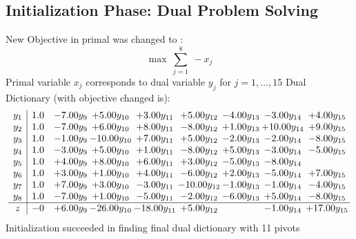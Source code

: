 \documentclass[9pt]{article}
\begin{document}
\subsection{Initialization Phase: Dual Problem Solving}
New Objective in primal was changed to : \[ \max\ \sum_{j=1}^{8}\ - x_j \] 
Primal variable $x_j$ corresponds to dual variable $y_j$ for $j = 1,\ldots,15$
Dual Dictionary (with objective changed is): 
\[\begin{array}{c| c c@{\hskip 2pt} c@{\hskip 2pt} c@{\hskip 2pt} c@{\hskip 2pt} c@{\hskip 2pt} c@{\hskip 2pt} c@{\hskip 2pt} }
 y_{1}   &  1.0 & -7.00 y_{9} & +  5.00 y_{10} & +  3.00 y_{11} & +  5.00 y_{12} & -4.00 y_{13} & -3.00 y_{14} & +  4.00 y_{15}\\
 y_{2}   &  1.0 & -7.00 y_{9} & +  6.00 y_{10} & +  8.00 y_{11} & -8.00 y_{12} & +  1.00 y_{13} & + 10.00 y_{14} & +  9.00 y_{15}\\
 y_{3}   &  1.0 & -1.00 y_{9} & -10.00 y_{10} & +  7.00 y_{11} & +  5.00 y_{12} & -2.00 y_{13} & -2.00 y_{14} & -8.00 y_{15}\\
 y_{4}   &  1.0 & -3.00 y_{9} & +  5.00 y_{10} & +  1.00 y_{11} & -8.00 y_{12} & +  5.00 y_{13} & -3.00 y_{14} & -5.00 y_{15}\\
 y_{5}   &  1.0 & +  4.00 y_{9} & +  8.00 y_{10} & +  6.00 y_{11} & +  3.00 y_{12} & -5.00 y_{13} & -8.00 y_{14} &   \\
 y_{6}   &  1.0 & +  3.00 y_{9} & +  1.00 y_{10} & +  4.00 y_{11} & -6.00 y_{12} & +  2.00 y_{13} & -5.00 y_{14} & +  7.00 y_{15}\\
 y_{7}   &  1.0 & +  7.00 y_{9} & +  3.00 y_{10} & -3.00 y_{11} & -10.00 y_{12} & -1.00 y_{13} & -1.00 y_{14} & -4.00 y_{15}\\
 y_{8}   &  1.0 & -7.00 y_{9} & +  1.00 y_{10} & -5.00 y_{11} & -2.00 y_{12} & -6.00 y_{13} & +  5.00 y_{14} & -8.00 y_{15}\\
\hline
z    &  -0 & +  6.00 y_{9} & -26.00 y_{10} & -18.00 y_{11} & +  5.00 y_{12} &   & -1.00 y_{14} & + 17.00 y_{15}\\
\end{array}\]
Initialization succeeded in finding final dual dictionary with 11 pivots
\end{document}
